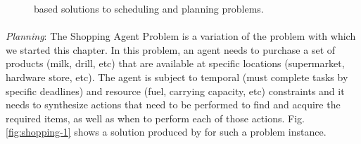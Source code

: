 {\begin{figure}[t]
\centering
{}\qquad
{}
\caption{\small \eu based solutions to scheduling and planning problems.}
\end{figure}


\paragraph{} \textit{Planning}: The Shopping Agent Problem
\cite{russelnorvig} is a variation of the problem with which we
started this chapter.  In this problem, an agent needs to purchase a
set of products (milk, drill, etc) that are available at specific
locations (supermarket, hardware store, etc). The agent is subject to
temporal (must complete tasks by specific deadlines) and resource
(fuel, carrying capacity, etc) constraints and it needs to synthesize
actions that need to be performed to find and acquire the required
items, as well as when to perform each of those actions.
Fig. \ref{fig:shopping-1} shows a solution produced by \eu for such a
problem instance.

}

